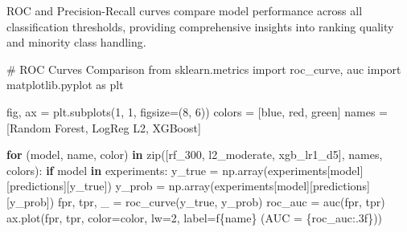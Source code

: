 \documentclass[
  letterpaper,
  DIV=11,
  numbers=noendperiod]{scrartcl}
\newenvironment{Shaded}{\begin{snugshade}}{\end{snugshade}}
\newcommand{\BuiltInTok}[1]{\textcolor[rgb]{0.00,0.23,0.31}{#1}}
\newcommand{\CommentTok}[1]{\textcolor[rgb]{0.37,0.37,0.37}{#1}}
\newcommand{\ControlFlowTok}[1]{\textcolor[rgb]{0.00,0.23,0.31}{\textbf{#1}}}
\newcommand{\DecValTok}[1]{\textcolor[rgb]{0.68,0.00,0.00}{#1}}
\newcommand{\ImportTok}[1]{\textcolor[rgb]{0.00,0.46,0.62}{#1}}
\newcommand{\KeywordTok}[1]{\textcolor[rgb]{0.00,0.23,0.31}{\textbf{#1}}}
\newcommand{\NormalTok}[1]{\textcolor[rgb]{0.00,0.23,0.31}{#1}}
\newcommand{\OperatorTok}[1]{\textcolor[rgb]{0.37,0.37,0.37}{#1}}
\newcommand{\SpecialCharTok}[1]{\textcolor[rgb]{0.37,0.37,0.37}{#1}}
\newcommand{\SpecialStringTok}[1]{\textcolor[rgb]{0.13,0.47,0.30}{#1}}
\newcommand{\StringTok}[1]{\textcolor[rgb]{0.13,0.47,0.30}{#1}}
\renewenvironment{Shaded}{%
  \begin{tcolorbox}[%
    enhanced,%
    colback=codebg,%
    colframe=codebg,%
    borderline west={3pt}{0pt}{sectionblue},%
    fontupper=\small\ttfamily,%
    boxrule=0pt,%
    arc=0pt,%
    boxsep=5pt,%
    left=2mm,%
    right=2mm,%
    top=2mm,%
    bottom=2mm%
  ]%
}{%
  \end{tcolorbox}%
}
\begin{document}
ROC and Precision-Recall curves compare model performance across all
classification thresholds, providing comprehensive insights into ranking
quality and minority class handling.

\begin{Shaded}
\begin{Highlighting}[]
\CommentTok{\# ROC Curves Comparison}
\ImportTok{from}\NormalTok{ sklearn.metrics }\ImportTok{import}\NormalTok{ roc\_curve, auc}
\ImportTok{import}\NormalTok{ matplotlib.pyplot }\ImportTok{as}\NormalTok{ plt}

\NormalTok{fig, ax }\OperatorTok{=}\NormalTok{ plt.subplots(}\DecValTok{1}\NormalTok{, }\DecValTok{1}\NormalTok{, figsize}\OperatorTok{=}\NormalTok{(}\DecValTok{8}\NormalTok{, }\DecValTok{6}\NormalTok{))}
\NormalTok{colors }\OperatorTok{=}\NormalTok{ [}\StringTok{\textquotesingle{}blue\textquotesingle{}}\NormalTok{, }\StringTok{\textquotesingle{}red\textquotesingle{}}\NormalTok{, }\StringTok{\textquotesingle{}green\textquotesingle{}}\NormalTok{]}
\NormalTok{names }\OperatorTok{=}\NormalTok{ [}\StringTok{\textquotesingle{}Random Forest\textquotesingle{}}\NormalTok{, }\StringTok{\textquotesingle{}LogReg L2\textquotesingle{}}\NormalTok{, }\StringTok{\textquotesingle{}XGBoost\textquotesingle{}}\NormalTok{]}

\ControlFlowTok{for}\NormalTok{ (model, name, color) }\KeywordTok{in} \BuiltInTok{zip}\NormalTok{([}\StringTok{\textquotesingle{}rf\_300\textquotesingle{}}\NormalTok{, }\StringTok{\textquotesingle{}l2\_moderate\textquotesingle{}}\NormalTok{, }\StringTok{\textquotesingle{}xgb\_lr1\_d5\textquotesingle{}}\NormalTok{], names, colors):}
    \ControlFlowTok{if}\NormalTok{ model }\KeywordTok{in}\NormalTok{ experiments:}
\NormalTok{        y\_true }\OperatorTok{=}\NormalTok{ np.array(experiments[model][}\StringTok{\textquotesingle{}predictions\textquotesingle{}}\NormalTok{][}\StringTok{\textquotesingle{}y\_true\textquotesingle{}}\NormalTok{])}
\NormalTok{        y\_prob }\OperatorTok{=}\NormalTok{ np.array(experiments[model][}\StringTok{\textquotesingle{}predictions\textquotesingle{}}\NormalTok{][}\StringTok{\textquotesingle{}y\_prob\textquotesingle{}}\NormalTok{])}
\NormalTok{        fpr, tpr, \_ }\OperatorTok{=}\NormalTok{ roc\_curve(y\_true, y\_prob)}
\NormalTok{        roc\_auc }\OperatorTok{=}\NormalTok{ auc(fpr, tpr)}
\NormalTok{        ax.plot(fpr, tpr, color}\OperatorTok{=}\NormalTok{color, lw}\OperatorTok{=}\DecValTok{2}\NormalTok{, label}\OperatorTok{=}\SpecialStringTok{f\textquotesingle{}}\SpecialCharTok{\{}\NormalTok{name}\SpecialCharTok{\}}\SpecialStringTok{ (AUC = }\SpecialCharTok{\{}\NormalTok{roc\_auc}\SpecialCharTok{:.3f\}}\SpecialStringTok{)\textquotesingle{}}\NormalTok{)}


\end{Highlighting}
\end{Shaded}
\end{document}
